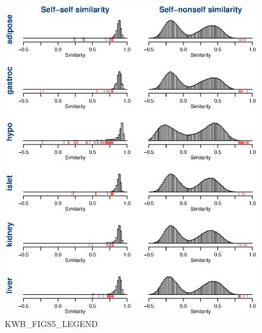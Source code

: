 \documentclass[letterpaper,twoside]{article}
\begin{document}
\begin{figure}[p]
\centerline{\includegraphics{SuppFigs/figS5.eps}}

\caption{KWB_FIGS5_LEGEND}
\end{figure}



\clearpage
\end{document}
